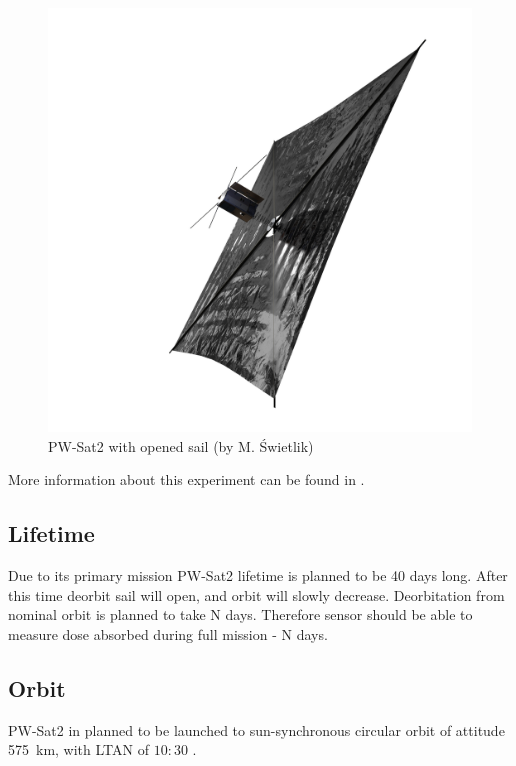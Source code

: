         \begin{figure}[H]
            \centering
            \includegraphics[width=0.7\paperwidth]{img/PW-Sat2_render_02.png}
            \caption{PW-Sat2 with opened sail (by M. Świetlik)}
            \label{PW-Sat_render_sail}
        \end{figure}

        More information about this experiment can be found in \cite{DDC_article}.

    \subsection{Lifetime}
        Due to its primary mission PW-Sat2 lifetime is planned to be 40 days long. After this time deorbit sail will open, and orbit will slowly decrease. Deorbitation from nominal orbit is planned to take N days. Therefore sensor should be able to measure dose absorbed during full mission - N days.

    \subsection{Orbit}
        PW-Sat2 in planned to be launched to sun-synchronous circular orbit of attitude \SI{575}{\kilo\meter}, with LTAN of $10:30$ \cite{PWSAT_MA_CDR}.



